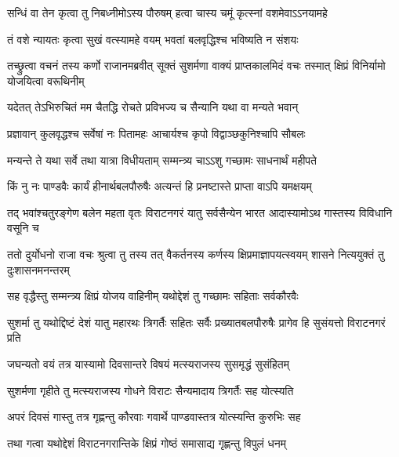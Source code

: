 \twolineshloka
{सन्धिं वा तेन कृत्वा तु निबध्नीमोऽस्य पौरुषम्}
{हत्वा चास्य चमूं कृत्स्नां वशमेवाऽऽनयामहे}


\twolineshloka
{तं वशे न्यायतः कृत्वा सुखं वत्स्यामहे वयम्}
{भवतां बलवृद्धिश्च भविष्यति न संशयः}



\onelineshloka
{तच्छ्रुत्वा वचनं तस्य कर्णो राजानमब्रवीत्}
\twolineshloka
{सूक्तं सुशर्मणा वाक्यं प्राप्तकालमिदं वचः}
{तस्मात् क्षिप्रं विनिर्यामो योजयित्वा वरूथिनीम्}


\twolineshloka
{यदेतत् तेऽभिरुचितं मम चैतद्धि रोचते}
{प्रविभज्य च सैन्यानि यथा वा मन्यते भवान्}





\twolineshloka
{प्रज्ञावान् कुलवृद्धश्च सर्वेषां नः पितामहः}
{आचार्यश्च कृपो विद्वाञ्छकुनिश्चापि सौबलः}


\twolineshloka
{मन्यन्ते ते यथा सर्वे तथा यात्रा विधीयताम्}
{सम्मन्त्र्य चाऽऽशु गच्छामः साधनार्थं महीपते}


\twolineshloka
{किं नु नः पाण्डवैः कार्यं हीनार्थबलपौरुषैः}
{अत्यन्तं हि प्रनष्टास्ते प्राप्ता वाऽपि यमक्षयम्}


\threelineshloka
{तद् भवांश्चतुरङ्गेण बलेन महता वृतः}
{विराटनगरं यातु सर्वसैन्येन भारत}
{आदास्यामोऽथ गास्तस्य विविधानि वसूनि च}



\threelineshloka
{ततो दुर्योधनो राजा वचः श्रुत्वा तु तस्य तत्}
{वैकर्तनस्य कर्णस्य क्षिप्रमाज्ञापयत्स्वयम्}
{शासने नित्ययुक्तं तु दुःशासनमनन्तरम्}




\twolineshloka
{सह वृद्धैस्तु सम्मन्त्र्य क्षिप्रं योजय वाहिनीम्}
{यथोद्देशं तु गच्छामः सहिताः सर्वकौरवैः}


\threelineshloka
{सुशर्मा तु यथोद्दिष्टं देशं यातु महारथः}
{त्रिगर्तैः सहितः सर्वैः प्रख्यातबलपौरुषैः}
{प्रागेव हि सुसंयत्तो विराटनगरं प्रति}


\twolineshloka
{जघन्यतो वयं तत्र यास्यामो दिवसान्तरे}
{विषयं मत्स्यराजस्य सुसमृद्धं सुसंहितम्}


\twolineshloka
{सुशर्मणा गृहीते तु मत्स्यराजस्य गोधने}
{विराटः सैन्यमादाय त्रिगर्तैः सह योत्स्यति}


\twolineshloka
{अपरं दिवसं गास्तु तत्र गृह्णन्तु कौरवाः}
{गवार्थे पाण्डवास्तत्र योत्स्यन्ति कुरुभिः सह}


\twolineshloka
{तथा गत्वा यथोद्देशं विराटनगरान्तिके}
{क्षिप्रं गोष्ठं समासाद्य गृह्णन्तु विपुलं धनम्}


